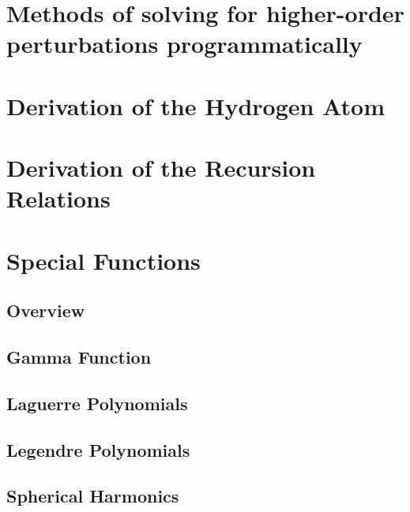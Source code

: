 \chapter{Methods of solving for higher-order perturbations programmatically}
\chapter{Derivation of the Hydrogen Atom}
\chapter{Derivation of the Recursion Relations}
\chapter{Special Functions}
    \section{Overview}
    \section{Gamma Function} \label{sec:Gamma_Function}
    \section{Laguerre Polynomials} \label{sec:Laguerre_Polynomial}
    \section{Legendre Polynomials} \label{sec:Legendre_Polynomial}
    \section{Spherical Harmonics}